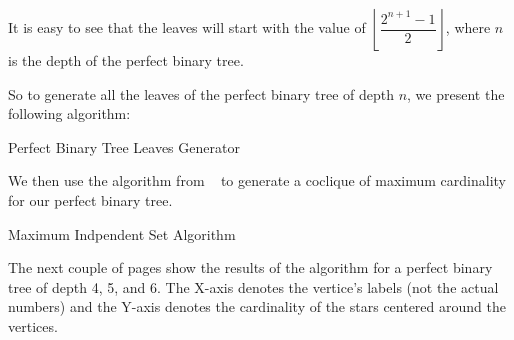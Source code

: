\documentclass{amsart}
\theoremstyle{definition}
\begin{document}
\begin{appendix}
	It is easy to see that the leaves will start with the value of $\left\lfloor\dfrac{2^{n + 1} - 1}{2}\right\rfloor$, where $n$ is the depth of the perfect binary tree.

	\newpage
	So to generate all the leaves of the perfect binary tree of depth $n$, we present the following algorithm:

	\begin{algorithm}[hbt!]
		\caption{Perfect Binary Tree Leaves Generator}\label{alg:leaves-generator}


	\end{algorithm}

	We then use the algorithm from ~\cite{Niskanen2003CliquerUG} to generate a coclique of maximum cardinality for our perfect binary tree.

	\begin{algorithm}[hbt!]
		\caption{Maximum Indpendent Set Algorithm}\label{alg:max-independent-set}


	\end{algorithm}


	The next couple of pages show the results of the algorithm for a perfect binary tree of depth 4, 5, and 6. The X-axis denotes the vertice's labels (not the actual numbers) and the Y-axis denotes the cardinality of the stars centered around the vertices.


\end{appendix}
\end{document}

